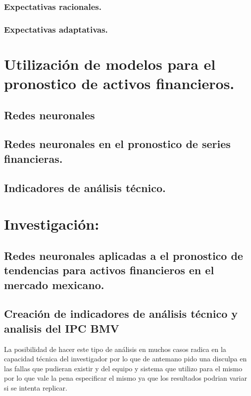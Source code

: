 \documentclass[letterpaper,12pt,oneside]{book}
\begin{document}
\subsection{Expectativas racionales.}

\subsection{Expectativas adaptativas.}


\chapter{Utilización de modelos para el pronostico de activos financieros.}

\section{Redes neuronales}

\section{Redes neuronales en el pronostico de series financieras.}

\section{Indicadores de análisis técnico.}

\chapter{Investigación:}
\section*{Redes neuronales aplicadas a el pronostico de tendencias para activos financieros en el mercado mexicano.}


\section{Creación de indicadores de análisis técnico y analisis del IPC BMV}
La posibilidad de hacer este tipo de análisis en muchos casos radica en la capacidad técnica del investigador por lo que de antemano pido una disculpa en las fallas que pudieran existir y del equipo y sistema que utilizo para el mismo por lo que vale la pena especificar el mismo ya que los resultados podrian variar si se intenta replicar.
\end{document}
